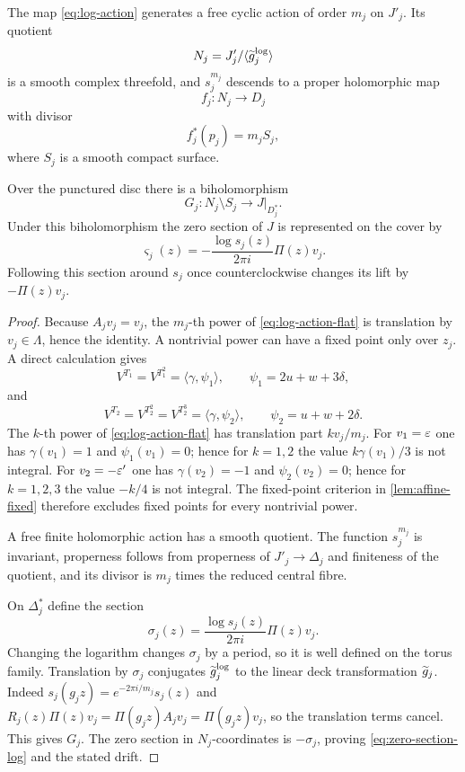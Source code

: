 \begin{theorem}\label{thm:finite-fillings}
The map \eqref{eq:log-action} generates a free cyclic action of order
$m_j$ on $J'_j$.  Its quotient
\[
 N_j=J'_j/\langle\widetilde g_j^{\mathrm{log}}\rangle
\]
is a smooth complex threefold, and $s_j^{m_j}$ descends to a proper
holomorphic map
\[
 f_j:N_j\longrightarrow D_j
\]
with divisor
\[
 f_j^*(p_j)=m_jS_j,
\]
where $S_j$ is a smooth compact surface.

Over the punctured disc there is a biholomorphism
\[
 G_j:N_j\setminus S_j\longrightarrow J|_{D_j^*}.
\]
Under this biholomorphism the zero section of $J$ is represented on the
cover by
\begin{equation}\label{eq:zero-section-log}
 \varsigma_j(z)=-\frac{\log s_j(z)}{2\pi i}\Pi(z)v_j.
\end{equation}
Following this section around $s_j$ once counterclockwise changes its
lift by $-\Pi(z)v_j$.
\end{theorem}

\begin{proof}
Because $A_jv_j=v_j$, the $m_j$-th power of
\eqref{eq:log-action-flat} is translation by $v_j\in\Lambda$, hence the
identity.  A nontrivial power can have a fixed point only over $z_j$.
A direct calculation gives
\[
 V^{T_1}=V^{T_1^2}=\langle\gamma,\psi_1\rangle,
 \qquad \psi_1=2u+w+3\delta,
\]
and
\[
 V^{T_2}=V^{T_2^2}=V^{T_2^3}=\langle\gamma,\psi_2\rangle,
 \qquad \psi_2=u+w+2\delta.
\]
The $k$-th power of \eqref{eq:log-action-flat} has translation part
$kv_j/m_j$.  For $v_1=\varepsilon$ one has
$\gamma(v_1)=1$ and $\psi_1(v_1)=0$; hence for $k=1,2$ the value
$k\gamma(v_1)/3$ is not integral.  For $v_2=-\varepsilon'$ one has
$\gamma(v_2)=-1$ and $\psi_2(v_2)=0$; hence for $k=1,2,3$ the value
$-k/4$ is not integral.  The fixed-point criterion in
\cref{lem:affine-fixed} therefore excludes fixed points for every
nontrivial power.

A free finite holomorphic action has a smooth quotient.  The function
$s_j^{m_j}$ is invariant, properness follows from properness of
$J'_j\to\Delta_j$ and finiteness of the quotient, and its divisor is
$m_j$ times the reduced central fibre.

On $\Delta_j^*$ define the section
\[
 \sigma_j(z)=\frac{\log s_j(z)}{2\pi i}\Pi(z)v_j.
\]
Changing the logarithm changes $\sigma_j$ by a period, so it is well
defined on the torus family.  Translation by $\sigma_j$ conjugates
$\widetilde g_j^{\mathrm{log}}$ to the linear deck transformation $\widetilde g_j$.
Indeed
$s_j(g_jz)=e^{-2\pi i/m_j}s_j(z)$ and
$R_j(z)\Pi(z)v_j=\Pi(g_jz)A_jv_j=\Pi(g_jz)v_j$, so the translation terms
cancel.  This gives $G_j$.  The zero section in $N_j$-coordinates is
$-\sigma_j$, proving \eqref{eq:zero-section-log} and the stated drift.
\end{proof}

